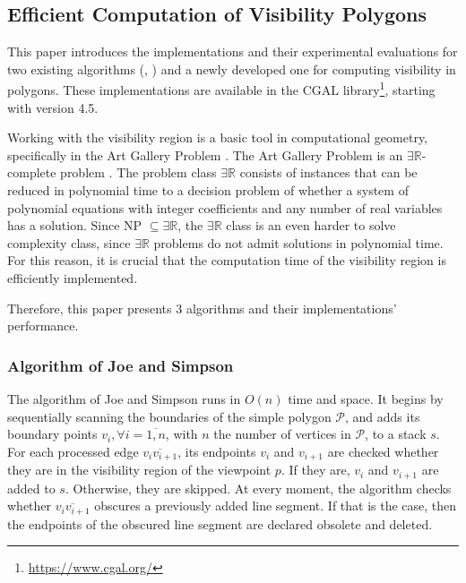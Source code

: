 \subsection{Efficient Computation of Visibility Polygons \cite{DBLP:journals/corr/BungiuHHHK14}}
This paper \cite{DBLP:journals/corr/BungiuHHHK14} introduces the implementations and their experimental evaluations for two existing algorithms (\cite{joe1987corrections}, \cite{asano1985efficient}) and a newly developed one for computing visibility in polygons. These implementations are available in the CGAL library\footnote{\url{https://www.cgal.org/}}, starting with version 4.5.

Working with the visibility region is a basic tool in computational geometry, specifically in the Art Gallery Problem \cite{o1987art}. The Art Gallery Problem \cite{o1987art} is an $\exists \mathbb R$-complete problem \cite{abrahamsen2021art}. The problem class $\exists \mathbb R$ consists of instances that can be reduced in polynomial time to a decision problem of whether a system of polynomial equations with integer coefficients and any number of real variables has a solution. Since NP $\subseteq \exists \mathbb R$, the $\exists \mathbb R$ class is an even harder to solve complexity class, since $\exists \mathbb R$ problems do not admit solutions in polynomial time. For this reason, it is crucial that the computation time of the visibility region is efficiently implemented. 

Therefore, this paper presents 3 algorithms and their implementations' performance.

\subsubsection{Algorithm of Joe and Simpson \cite{joe1987corrections}}
The algorithm of Joe and Simpson \cite{joe1987corrections} runs in $O(n)$ time and space. It begins by sequentially scanning the boundaries of the simple polygon $\mathcal P$, and adds its boundary points $v_i, \forall i = \overline{1, n}$, with $n$ the number of vertices in $\mathcal P$, to a stack $s$. For each processed edge $\overline{v_iv_{i + 1}}$, its endpoints $v_i$ and $v_{i + 1}$ are checked whether they are in the visibility region of the viewpoint $p$. If they are, $v_i$ and $v_{i + 1}$ are added to $s$. Otherwise, they are skipped. At every moment, the algorithm checks whether $\overline{v_iv_{i + 1}}$ obscures a previously added line segment. If that is the case, then the endpoints of the obscured line segment are declared obsolete and deleted. 

